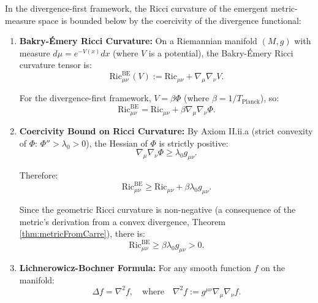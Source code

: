 \begin{theorem}
\label{thm:bakryEmeryRicciMassGap}

In the divergence-first framework, the Ricci curvature of the emergent metric-measure space is bounded below by the coercivity of the divergence functional:

\begin{enumerate}

\item \textbf{Bakry-Émery Ricci Curvature:} On a Riemannian manifold $(M, g)$ with measure $d\mu = e^{-V(x)} dx$ (where $V$ is a potential), the Bakry-Émery Ricci curvature tensor is:
\begin{equation}
\mathrm{Ric}^{\mathrm{BE}}_{\mu\nu}(V) := \mathrm{Ric}_{\mu\nu} + \nabla_\mu \nabla_\nu V.
\label{eq:bakryEmeryRicci}
\end{equation}

For the divergence-first framework, $V = \beta \Phi$ (where $\beta = 1/T_{\text{Planck}}$), so:
\begin{equation}
\mathrm{Ric}^{\mathrm{BE}}_{\mu\nu} = \mathrm{Ric}_{\mu\nu} + \beta \nabla_\mu \nabla_\nu \Phi.
\end{equation}

\item \textbf{Coercivity Bound on Ricci Curvature:} By Axiom II.ii.a (strict convexity of $\Phi$: $\Phi'' > \lambda_0 > 0$), the Hessian of $\Phi$ is strictly positive:
\begin{equation}
\nabla_\mu \nabla_\nu \Phi \geq \lambda_0 g_{\mu\nu}.
\end{equation}

Therefore:
\begin{equation}
\mathrm{Ric}^{\mathrm{BE}}_{\mu\nu} \geq \mathrm{Ric}_{\mu\nu} + \beta \lambda_0 g_{\mu\nu}.
\label{eq:ricciLowerBound}
\end{equation}

Since the geometric Ricci curvature is non-negative (a consequence of the metric's derivation from a convex divergence, Theorem \ref{thm:metricFromCarre}), there is:
\begin{equation}
\mathrm{Ric}^{\mathrm{BE}}_{\mu\nu} \geq \beta \lambda_0 g_{\mu\nu} > 0.
\label{eq:ricciStrictlyPositive}
\end{equation}

\item \textbf{Lichnerowicz-Bochner Formula:} For any smooth function $f$ on the manifold:
\begin{equation}
\Delta f = \nabla^2 f, \quad \text{where} \quad \nabla^2 f := g^{\mu\nu} \nabla_\mu \nabla_\nu f.
\end{equation}


\end{enumerate}
\end{theorem}
